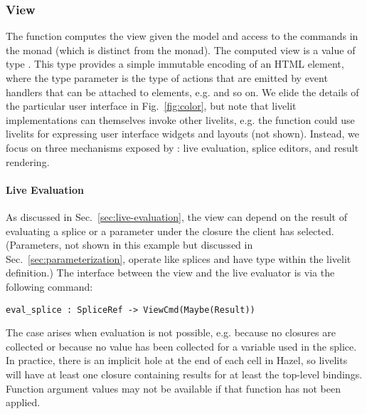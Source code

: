 \subsubsection{View}\label{sec:def-view}
The  function computes the view given the model and access to the commands in 
the  monad (which is distinct from the  monad). The computed view is a value of type .  
This type  provides a simple immutable
encoding of an HTML element, where the type parameter is the type of actions that 
are emitted by event handlers that can be attached to elements, e.g.
 and so on. 
We elide the details of the particular user interface in Fig.~\ref{fig:color}, 
but note that livelit implementations can themselves invoke other  
livelits, e.g. the  function could use livelits for 
expressing user interface widgets and layouts (not shown). 
Instead, we focus on three mechanisms exposed by : live evaluation,
splice editors, and result rendering.


\paragraph{Live Evaluation}
\label{sec:live-evaluation-def}
As discussed in Sec.~\ref{sec:live-evaluation}, 
the view can depend on the result of evaluating a splice or a parameter
under the closure the client has selected.
(Parameters, not shown in this example but discussed in Sec.~\ref{sec:parameterization}, operate like splices and have type 
within the livelit definition.)
The interface between the view and the live evaluator 
is via the 
following command:
\begin{lstlisting}[numbers=none,xleftmargin=0cm]
eval_splice : SpliceRef -> ViewCmd(Maybe(Result))
\end{lstlisting}


The  case 
arises when evaluation is not possible, e.g. because no closures are collected 
or because no value has been collected for a variable used in the splice. 
In practice, there is an implicit hole at the end of each cell in Hazel, so 
livelits will have at least one closure containing results for at least 
the top-level bindings. Function argument values may not be available 
if that function has not been applied.

